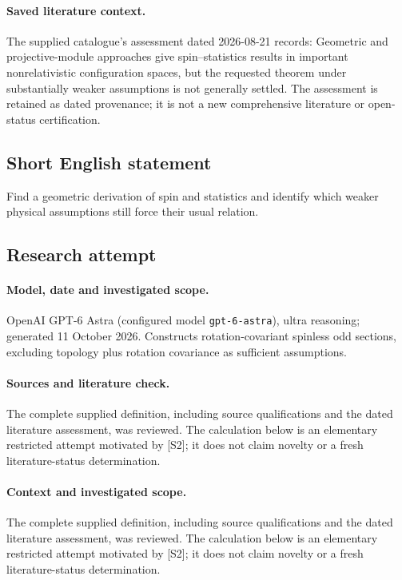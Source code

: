 \documentclass[11pt]{article}
\begin{document}
\paragraph{Saved literature context.} The supplied catalogue's assessment dated 2026-08-21 records: Geometric and projective-module approaches give spin--statistics results in important nonrelativistic configuration spaces, but the requested theorem under substantially weaker assumptions is not generally settled. The assessment is retained as dated provenance; it is not a new comprehensive literature or open-status certification.
\subsection{Short English statement}
Find a geometric derivation of spin and statistics and identify which weaker physical assumptions still force their usual relation.
\subsection{Research attempt}
\paragraph{Model, date and investigated scope.}
OpenAI GPT-6 Astra (configured model \texttt{gpt-6-astra}), ultra reasoning; generated 11 October 2026. Constructs rotation-covariant spinless odd sections, excluding topology plus rotation covariance as sufficient assumptions.

\paragraph{Sources and literature check.}
The complete supplied definition, including source qualifications and the dated literature assessment, was reviewed. The calculation below is an elementary restricted attempt motivated by [S2]; it does not claim novelty or a fresh literature-status determination.

\paragraph{Context and investigated scope.} The complete supplied definition, including source qualifications and the dated literature assessment, was reviewed. The calculation below is an elementary restricted attempt motivated by [S2]; it does not claim novelty or a fresh literature-status determination.
\end{document}

